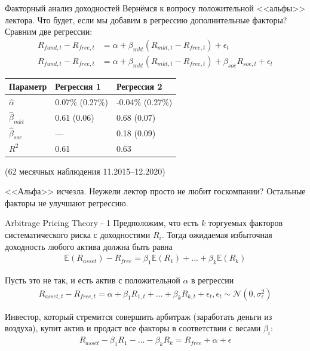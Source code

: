 \documentclass{beamer}
\begin{document}
\begin{frame}{Факторный анализ доходностей}
\justify
Вернёмся к вопросу положительной <<альфы>> лектора. Что будет, если мы добавим в регрессию дополнительные факторы? Сравним две регрессии:
\begin{align*}
R_{fund,t} - R_{free,t} &= \alpha + \beta_{mkt}(R_{mkt,t} - R_{free,t}) + \epsilon_t
\\
R_{fund,t} - R_{free,t} &= \alpha + \beta_{mkt}(R_{mkt,t} - R_{free,t}) + \beta_{soe}R_{soe,t} + \epsilon_t
\end{align*}

\centering
\begin{tabular}{l|l|l}
Параметр            & Регрессия 1                   & Регрессия 2 \\ \hline
$\hat{\alpha}$      & 0.07\% {\scriptsize (0.27\%)} & -0.04\% {\scriptsize (0.27\%)} \\
$\hat{\beta}_{mkt}$ & 0.61 {\scriptsize (0.06)}     & 0.68 {\scriptsize (0.07)} \\
$\hat{\beta}_{soe}$ & ---                           & 0.18 {\scriptsize (0.09)} \\
$R^2$               & 0.61                          & 0.63 \\ \hline
\end{tabular}

{\scriptsize (62 месячных наблюдения 11.2015--12.2020)}

\justify
<<Альфа>> исчезла. Неужели лектор просто не любит госкомпании? Остальные факторы не улучшают регрессию.


\end{frame}



\begin{frame}{Arbitrage Pricing Theory - 1}
\justify
Предположим, что есть $k$ торгуемых факторов систематического риска с доходностями $R_i$. Тогда ожидаемая избыточная доходность любого актива должна быть равна
\begin{align*}
\mathbb{E}(R_{asset}) - R_{free} = \beta_1\mathbb{E}(R_1) + ... + \beta_k\mathbb{E}(R_k)
\end{align*}

Пусть это не так, и есть актив с положительной $\alpha$ в регрессии
\begin{align*}
R_{asset,t} - R_{free,t} = \alpha + \beta_1R_{1,t} + ... + \beta_kR_{k,t} + \epsilon_t, \epsilon_t \sim \mathcal{N}(0, \sigma_{\epsilon}^2)
\end{align*}

Инвестор, который стремится совершить арбитраж (заработать деньги из воздуха), купит актив и продаст все факторы в соответствии с весами $\beta_i$:
\begin{align*}
R_{asset} - \beta_1 R_{1} - ... - \beta_k R_k = R_{free} + \alpha + \epsilon
\end{align*}
\end{frame}
\end{document}
